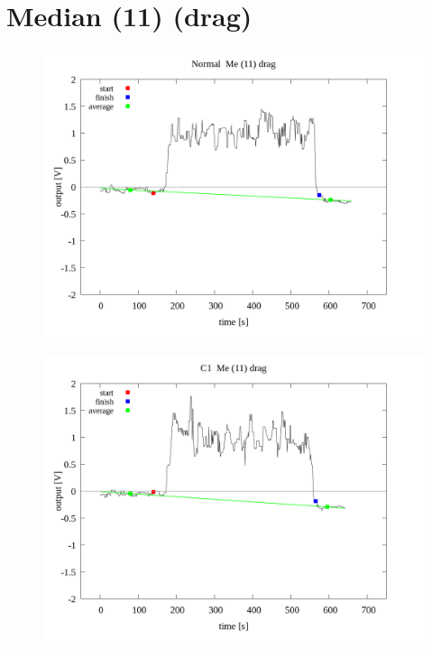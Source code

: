 \documentclass[a4paper]{jsarticle}
\author{}
\title{}
\date{}
\begin{document}
\section{Median (11) (drag)}

\begin{figure}[htbp]
    \footnotesize
    \begin{center}
        \includegraphics[width=140mm]{../../../../33_result/210806/median/11/drag/03/Normal_me(11)_drag_03.png}
    \end{center}
\end{figure}

\begin{figure}[htbp]
    \footnotesize
    \begin{center}
        \includegraphics[width=140mm]{../../../../33_result/210806/median/11/drag/03/C1_me(11)_drag_03.png}
    \end{center}
\end{figure}
\end{document}
